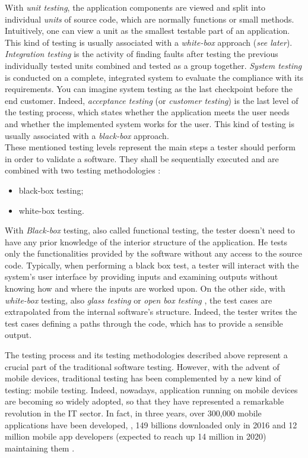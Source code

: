 With \textit{unit testing}, the application components are viewed and split into  individual \textit{units} of source code, which are normally functions or small methods. Intuitively, one can view a unit as the smallest testable part of an application. This kind of testing is usually associated with a \textit{white-box} approach (\textit{see later}).  \textit{Integration testing} is the activity of finding faults after testing the previous individually tested units combined and tested as a group together. \textit{System testing} is conducted on a complete, integrated system to evaluate the compliance with its requirements. You can imagine system testing as the last checkpoint before the end customer. Indeed, \textit{acceptance testing} (or \textit{customer testing}) is the last level of the testing process, which states whether the application meets the user needs and whether the implemented system works for the user. This kind of testing is usually associated with a \textit{black-box} approach. 
\\
These mentioned testing levels represent the main steps a tester should perform in order to validate a software. They shall be sequentially executed and are combined with two testing methodologies \cite{white-box, black-box}: 
\begin{itemize}
\item black-box testing;
\item white-box testing.
\end{itemize} 
With \textit{Black-box} testing, also called functional testing, the tester doesn't need to have any prior knowledge of the interior structure of the application. He tests only the functionalities provided by the software without any access to the source code. Typically, when performing a black box test, a tester will interact with the system's user interface by providing inputs and examining outputs without knowing how and where the inputs are worked upon. On the other side, with \textit{white-box} testing, also \textit{glass testing} or \textit{open box testing} \cite{grano}, the test cases are extrapolated from the internal software's structure. Indeed, the tester writes the test cases defining a paths through the code, which has to provide a sensible output.

The testing process and its testing methodologies described above represent a crucial part of the traditional software testing. 
However, with the advent of mobile devices, traditional testing has been complemented by a new kind of testing: mobile testing.
Indeed, nowadays, application running on mobile devices are becoming so widely adopted, so that they have represented a remarkable revolution in the IT sector. In fact, in three years, over 300,000 mobile applications have been developed, \cite{muccini}, 149 billions downloaded only in 2016 \cite{statista} and 12 million mobile app developers (expected to reach up 14 million in 2020) maintaining them \cite{DevRelate}. 






